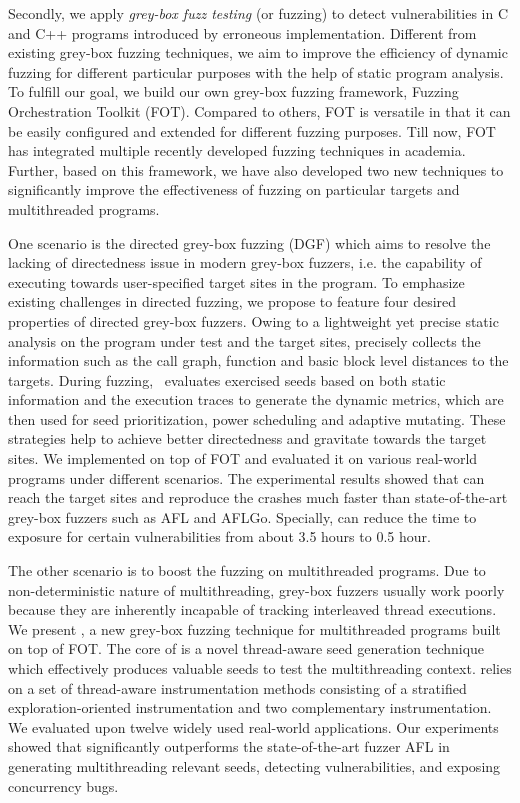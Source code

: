 \documentclass[12pt, a4paper, oneside]{Thesis}
\begin{document}
{Secondly, we apply \emph{grey-box fuzz testing} (or fuzzing) to detect vulnerabilities in C and C++ programs introduced by erroneous implementation. Different from existing grey-box fuzzing techniques, we aim to improve the efficiency of dynamic fuzzing for different particular purposes with the help of static program analysis. To fulfill our goal, we build our own grey-box fuzzing framework, Fuzzing Orchestration Toolkit (FOT). Compared to others, FOT is versatile in that it can be easily configured and extended for different fuzzing purposes. Till now, FOT has integrated multiple recently developed fuzzing techniques in academia. Further, based on this framework, we have also developed two new techniques to significantly improve the effectiveness of fuzzing on particular targets and multithreaded programs.

One scenario is the directed grey-box fuzzing (DGF) which aims to resolve the lacking of directedness issue in modern grey-box fuzzers, i.e. the capability of executing towards user-specified target sites in the program.
To emphasize existing challenges in \mbox{directed} fuzzing, we propose \dFOT to feature four desired properties of directed grey-box fuzzers.
Owing to a lightweight yet precise static analysis on the program under test and the target sites, \dFOT precisely collects the information such as the call graph, function and \mbox{basic} block level distances to the targets.
During fuzzing, \dFOT~{evaluates} exercised seeds based on both static information and the \mbox{execution} traces to generate the dynamic metrics, which are then used for seed prioritization, power scheduling and adaptive \mbox{mutating}.
These strategies help \dFOT to achieve better directedness and gravitate towards the target sites.
We implemented \dFOT on top of FOT and evaluated it on various real-world \mbox{programs} under different scenarios.
The experimental results showed that \dFOT can reach the target sites and reproduce the crashes much faster than state-of-the-art grey-box fuzzers such as AFL and AFLGo. Specially, \dFOT can reduce the time to exposure for certain vulnerabilities from about 3.5 hours to 0.5 hour. 

The other scenario is to boost the fuzzing on multithreaded programs. Due to non-deterministic nature of multithreading, grey-box fuzzers usually work poorly because they are inherently incapable of tracking interleaved thread executions. We present \mtfuzz, a new grey-box fuzzing technique for multithreaded programs built on top of FOT. The core of \mtfuzz is a novel thread-aware seed generation technique which effectively produces valuable seeds to test the multithreading context. \mtfuzz relies on a set of thread-aware instrumentation methods consisting of a stratified exploration-oriented instrumentation and two complementary instrumentation. We evaluated \mtfuzz upon twelve widely used real-world applications. Our experiments showed that \mtfuzz significantly outperforms the state-of-the-art fuzzer AFL in generating multithreading relevant seeds, detecting vulnerabilities, and exposing concurrency bugs.

}
\end{document}
